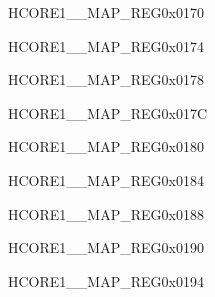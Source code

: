 \begin{register}{H}{CORE1\_\_MAP\_REG}{0x0170}\label{regdesc:CORE1SBDINTMAPREG}
\end{register}\vspace{-3em}


\begin{register}{H}{CORE1\_\_MAP\_REG}{0x0174}\label{regdesc:CORE1USBOTGINTMAPREG}
\end{register}\vspace{-3em}


\begin{register}{H}{CORE1\_\_MAP\_REG}{0x0178}\label{regdesc:CORE1USBOTGENDPMULTIPROCINTMAPREG}
\end{register}\vspace{-3em}


\begin{register}{H}{CORE1\_\_MAP\_REG}{0x017C}\label{regdesc:CORE1JPEGINTMAPREG}
\end{register}\vspace{-3em}


\begin{register}{H}{CORE1\_\_MAP\_REG}{0x0180}\label{regdesc:CORE1PPAINTMAPREG}
\end{register}\vspace{-3em}


\begin{register}{H}{CORE1\_\_MAP\_REG}{0x0184}\label{regdesc:CORE1CORE0TRACEINTMAPREG}
\end{register}\vspace{-3em}


\begin{register}{H}{CORE1\_\_MAP\_REG}{0x0188}\label{regdesc:CORE1CORE1TRACEINTMAPREG}
\end{register}\vspace{-3em}



\begin{register}{H}{CORE1\_\_MAP\_REG}{0x0190}\label{regdesc:CORE1ISPINTMAPREG}
\end{register}\vspace{-3em}


\begin{register}{H}{CORE1\_\_MAP\_REG}{0x0194}\label{regdesc:CORE1I3CMSTINTMAPREG}
\end{register}\vspace{-3em}


